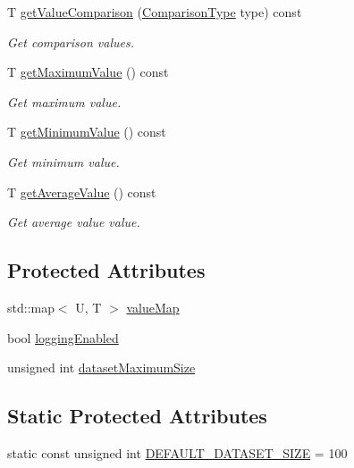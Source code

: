 \begin{DoxyCompactItemize}
\-T \hyperlink{classcryomesh_1_1dataobjects_1_1DataObject_a1069d7cb1f2eb64c23d5eff7a5e15285}{get\-Value\-Comparison} (\hyperlink{classcryomesh_1_1dataobjects_1_1DataObject_a88c071e82534aa8b82c336a8104f9df8}{\-Comparison\-Type} type) const 
\begin{DoxyCompactList}\small\item\em \-Get comparison values. \end{DoxyCompactList}\item 
\-T \hyperlink{classcryomesh_1_1dataobjects_1_1DataObject_af92f3014a1406b596854b4b2fc9677a0}{get\-Maximum\-Value} () const 
\begin{DoxyCompactList}\small\item\em \-Get maximum value. \end{DoxyCompactList}\item 
\-T \hyperlink{classcryomesh_1_1dataobjects_1_1DataObject_a13afe46cb0349fba1a48636d34a46810}{get\-Minimum\-Value} () const 
\begin{DoxyCompactList}\small\item\em \-Get minimum value. \end{DoxyCompactList}\item 
\-T \hyperlink{classcryomesh_1_1dataobjects_1_1DataObject_ad1cd1f103cdaabb509abae7709cd8b09}{get\-Average\-Value} () const 
\begin{DoxyCompactList}\small\item\em \-Get average value value. \end{DoxyCompactList}\end{DoxyCompactItemize}
\subsection*{\-Protected \-Attributes}
\begin{DoxyCompactItemize}
\item 
std\-::map$<$ \-U, \-T $>$ \hyperlink{classcryomesh_1_1dataobjects_1_1DataObject_a9f345f10bea7d0554e09dbb4f598cd57}{value\-Map}
\item 
bool \hyperlink{classcryomesh_1_1dataobjects_1_1DataObject_a02128a10817ab449328375401f0199a9}{logging\-Enabled}
\item 
unsigned int \hyperlink{classcryomesh_1_1dataobjects_1_1DataObject_acec41108abc1ba2b1228e79bf14bb991}{dataset\-Maximum\-Size}
\end{DoxyCompactItemize}
\subsection*{\-Static \-Protected \-Attributes}
\begin{DoxyCompactItemize}
\item 
static const unsigned int \hyperlink{classcryomesh_1_1dataobjects_1_1DataObject_a493f002671f8c2d4db2b2a2953e434a0}{\-D\-E\-F\-A\-U\-L\-T\-\_\-\-D\-A\-T\-A\-S\-E\-T\-\_\-\-S\-I\-Z\-E} = 100
\end{DoxyCompactItemize}
